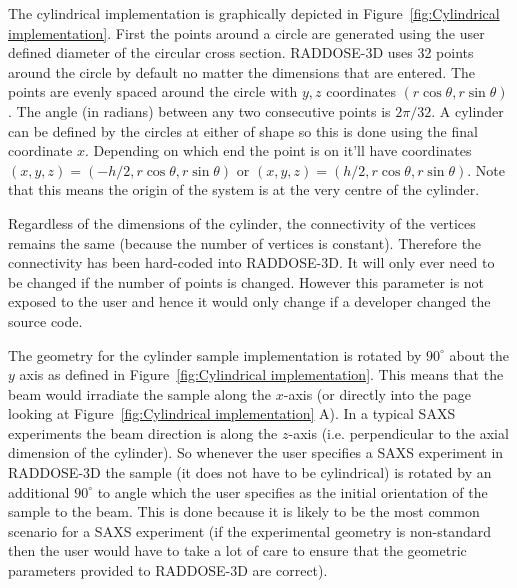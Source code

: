 The cylindrical implementation is graphically depicted in Figure~\ref{fig:Cylindrical implementation}.
First the points around a circle are generated using the user defined diameter of the circular cross section.
RADDOSE-3D uses 32 points around the circle by default no matter the dimensions that are entered.
The points are evenly spaced around the circle with $y, z$ coordinates $(r \cos \theta, r \sin \theta)$.
The angle (in radians) between any two consecutive points is $2 \pi / 32$.
A cylinder can be defined by the circles at either of shape so this is done using the final coordinate $x$.
Depending on which end the point is on it'll have coordinates $(x, y, z) = (-h/2, r \cos \theta, r \sin \theta)$ or $(x, y, z) = (h/2, r \cos \theta, r \sin \theta)$.
Note that this means the origin of the system is at the very centre of the cylinder.

Regardless of the dimensions of the cylinder, the connectivity of the vertices remains the same (because the number of vertices is constant).
Therefore the connectivity has been hard-coded into RADDOSE-3D.
It will only ever need to be changed if the number of points is changed.
However this parameter is not exposed to the user and hence it would only change if a developer changed the source code.

The geometry for the cylinder sample implementation is rotated by $90^{\circ}$ about the $y$ axis as defined in Figure~\ref{fig:Cylindrical implementation}.
This means that the beam would irradiate the sample along the $x$-axis (or directly into the page looking at Figure~\ref{fig:Cylindrical implementation} A).
In a typical SAXS experiments the beam direction is along the $z$-axis (i.e. perpendicular to the axial dimension of the cylinder).
So whenever the user specifies a SAXS experiment in RADDOSE-3D the sample (it does not have to be cylindrical) is rotated by an additional $90^{\circ}$ to angle which the user specifies as the initial orientation of the sample to the beam.
This is done because it is likely to be the most common scenario for a SAXS experiment (if the experimental geometry is non-standard then the user would have to take a lot of care to ensure that the geometric parameters provided to RADDOSE-3D are correct).
